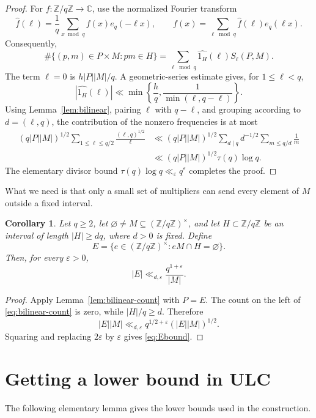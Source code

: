 \documentclass[11pt]{amsart}
\newtheorem{corollary}[theorem]{Corollary}
\newcommand{\Z}{\mathbb Z}
\newcommand{\eps}{\varepsilon}
\begin{document}
\begin{proof}
For $f:\Z/q\Z\to\mathbb C$, use the normalized Fourier transform
$$
 \widehat f(\ell)=\frac1q\sum_{x\bmod q}f(x)e_q(-\ell x),
 \qquad
 f(x)=\sum_{\ell\bmod q}\widehat f(\ell)e_q(\ell x).
$$
Consequently,
$$
 \#\{(p,m)\in P\times M:pm\in H\}
 =\sum_{\ell\bmod q}\widehat{1_H}(\ell)S_\ell(P,M).
$$
The term $\ell=0$ is $h|P||M|/q$.  A geometric-series estimate gives, for
$1\le\ell<q$,
$$
 |\widehat{1_H}(\ell)|
 \ll \min\left\{\frac hq,
 \frac1{\min(\ell,q-\ell)}\right\}.
$$
Using Lemma~\ref{lem:bilinear}, pairing $\ell$ with $q-\ell$, and grouping
according to $d=(\ell,q)$, the contribution of the nonzero frequencies is at
most
\begin{align*}
 (q|P||M|)^{1/2}
 \sum_{1\le\ell\le q/2}\frac{(\ell,q)^{1/2}}{\ell}
 &\ll (q|P||M|)^{1/2}
 \sum_{d\mid q}d^{-1/2}\sum_{m\le q/d}\frac1m\\
 &\ll (q|P||M|)^{1/2}\tau(q)\log q.
\end{align*}
The elementary divisor bound $\tau(q)\log q\ll_\eps q^\eps$ completes the
proof.
\end{proof}

What we need is that only a small set of multipliers can send
every element of $M$ outside a fixed interval.

\begin{corollary}\label{lem:interval-hitting}
Let $q\ge2$, let $\varnothing\ne M\subseteq(\Z/q\Z)^\times$, and let
$H\subset\Z/q\Z$ be an interval of length $|H|\ge dq$, where $d>0$ is fixed.
Define
$$
 E=\{e\in(\Z/q\Z)^\times:eM\cap H=\varnothing\}.
$$
Then, for every $\eps>0$,
\begin{equation}\label{eq:Ebound}
 |E|\ll_{d,\eps}\frac{q^{1+\eps}}{|M|}.
\end{equation}
\end{corollary}

\begin{proof}
Apply Lemma~\ref{lem:bilinear-count} with $P=E$.  The count on the left of
\eqref{eq:bilinear-count} is zero, while $|H|/q\ge d$.  Therefore
$$
 |E||M|\ll_{d,\eps}
 q^{1/2+\eps}(|E||M|)^{1/2}.
$$
Squaring and replacing $2\eps$ by $\eps$ gives \eqref{eq:Ebound}.
\end{proof}


\section{Getting a lower bound in ULC}\label{sec:rational-estimate}

The following elementary lemma gives the lower bounds used in the construction.
\end{document}
